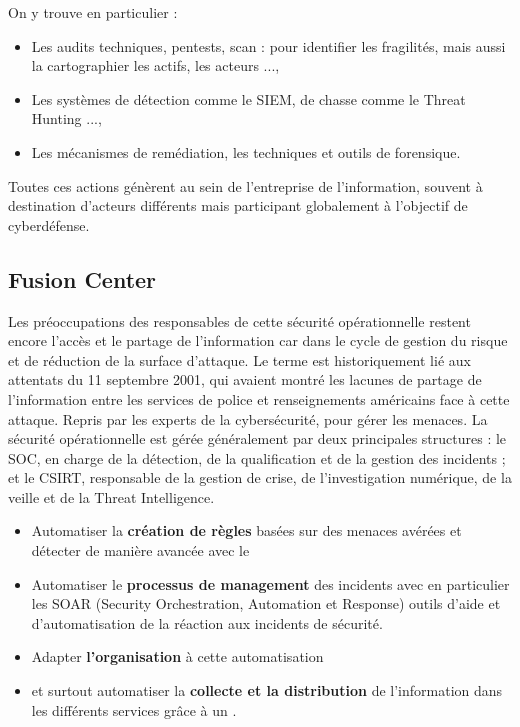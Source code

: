On y trouve en particulier : 

\begin{itemize}
  \item Les audits techniques, pentests, scan : pour identifier les fragilités, mais aussi la cartographier les actifs, les acteurs ...,
  \item Les systèmes de détection comme le SIEM, de chasse comme le Threat Hunting ...,
  \item Les mécanismes de remédiation, les techniques et outils de forensique.
\end{itemize}

Toutes ces actions génèrent au sein de l'entreprise de l'information, souvent à destination d'acteurs différents mais participant globalement à l'objectif de cyberdéfense.

\subsection{Fusion Center}

Les préoccupations des responsables de cette sécurité opérationnelle restent encore l'accès et le partage de l'information car dans le cycle de gestion du risque et de réduction de la surface d'attaque. Le terme  est historiquement lié aux attentats du 11 septembre 2001, qui avaient montré les lacunes de partage de l'information entre les services de police et renseignements américains face à cette attaque. Repris par les experts de la cybersécurité, pour gérer les menaces. 
La sécurité opérationnelle est gérée généralement par deux principales structures : le SOC, en charge de la détection, de la qualification et de la gestion des incidents ; et le CSIRT, responsable de la gestion de crise, de l’investigation numérique, de la veille et de la Threat Intelligence.



\begin{itemize}
  \item Automatiser la \textbf{création de règles} basées sur des menaces avérées  et détecter de manière avancée avec le 
  \item Automatiser le \textbf{processus de management }des incidents avec en  particulier les SOAR (Security Orchestration, Automation et Response) outils d’aide et d’automatisation de la réaction aux incidents de sécurité.
  \item Adapter \textbf{l’organisation} à cette automatisation
  \item et surtout automatiser la \textbf{collecte et la distribution} de l'information dans les différents services grâce à un .
\end{itemize}



